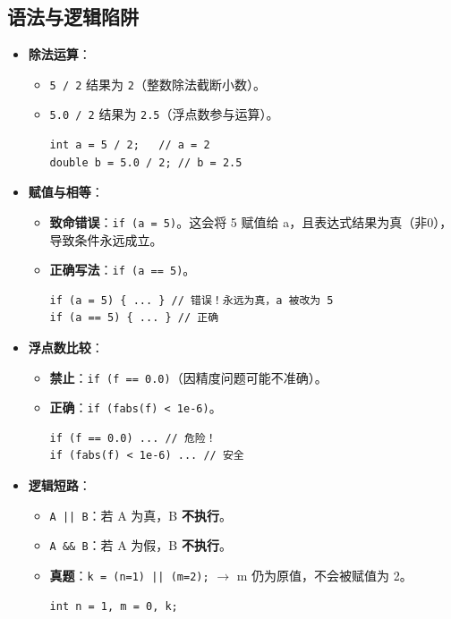 \documentclass[a4paper,12pt]{article}
\begin{document}
\subsection{语法与逻辑陷阱}
\begin{itemize}
    \item \textbf{除法运算}：
    \begin{itemize}
        \item \texttt{5 / 2} 结果为 \texttt{2}（整数除法截断小数）。
        \item \texttt{5.0 / 2} 结果为 \texttt{2.5}（浮点数参与运算）。
\begin{lstlisting}
int a = 5 / 2;   // a = 2
double b = 5.0 / 2; // b = 2.5
\end{lstlisting}
    \end{itemize}
    \item \textbf{赋值与相等}：
    \begin{itemize}
        \item \textbf{致命错误}：\texttt{if (a = 5)}。这会将 5 赋值给 a，且表达式结果为真（非0），导致条件永远成立。
        \item \textbf{正确写法}：\texttt{if (a == 5)}。
\begin{lstlisting}
if (a = 5) { ... } // 错误！永远为真，a 被改为 5
if (a == 5) { ... } // 正确
\end{lstlisting}
    \end{itemize}
    \item \textbf{浮点数比较}：
    \begin{itemize}
        \item \textbf{禁止}：\texttt{if (f == 0.0)}（因精度问题可能不准确）。
        \item \textbf{正确}：\texttt{if (fabs(f) < 1e-6)}。
\begin{lstlisting}
if (f == 0.0) ... // 危险！
if (fabs(f) < 1e-6) ... // 安全
\end{lstlisting}
    \end{itemize}
    \item \textbf{逻辑短路}：
    \begin{itemize}
        \item \texttt{A || B}：若 A 为真，B \textbf{不执行}。
        \item \texttt{A \&\& B}：若 A 为假，B \textbf{不执行}。
        \item \textbf{真题}：\texttt{k = (n=1) || (m=2);} $\rightarrow$ m 仍为原值，不会被赋值为 2。
\begin{lstlisting}
int n = 1, m = 0, k;

\end{lstlisting}
\end{itemize}
\end{itemize}
\end{document}
